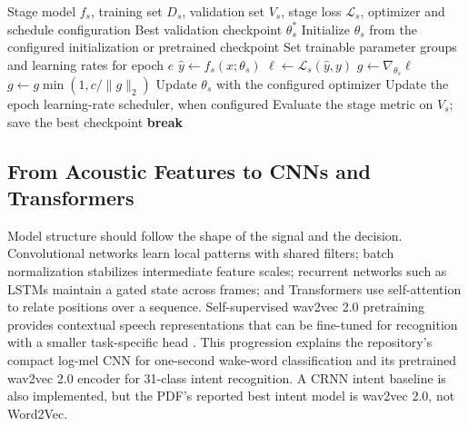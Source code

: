 \begin{algorithm}[H]
  \caption{Stage-wise training with the loss and parameter schedule for each model}
  \label{alg:stagewise-training}
  \begin{algorithmic}[1]
    \Require Stage model $f_s$, training set $D_s$, validation set $V_s$, stage loss $\mathcal{L}_s$, optimizer and schedule configuration
    \Ensure Best validation checkpoint $\theta_s^*$
    \State Initialize $\theta_s$ from the configured initialization or pretrained checkpoint
      \State Set trainable parameter groups and learning rates for epoch $e$
        \State $\hat y\gets f_s(x;\theta_s)$
        \State $\ell\gets\mathcal{L}_s(\hat y,y)$
        \State $g\gets\nabla_{\theta_s}\ell$
        \State $g\gets g\min(1,c/\lVert g\rVert_2)$ 
        \State Update $\theta_s$ with the configured optimizer
      \EndFor
      \State Update the epoch learning-rate scheduler, when configured
      \State Evaluate the stage metric on $V_s$; save the best checkpoint
        \State \textbf{break}
      \EndIf
    \EndFor
  \end{algorithmic}
\end{algorithm}

\subsection{From Acoustic Features to CNNs and Transformers}
\label{subsec:architectures}

Model structure should follow the shape of the signal and the decision. Convolutional networks learn local patterns with shared filters; batch normalization stabilizes intermediate feature scales; recurrent networks such as LSTMs maintain a gated state across frames; and Transformers use self-attention to relate positions over a sequence. Self-supervised wav2vec 2.0 pretraining provides contextual speech representations that can be fine-tuned for recognition with a smaller task-specific head \cite{lecun1998,batchnorm2015,lstm1997,transformer2017,wav2vec2,dscnnkws}. This progression explains the repository's compact log-mel CNN for one-second wake-word classification and its pretrained wav2vec 2.0 encoder for 31-class intent recognition. A CRNN intent baseline is also implemented, but the PDF's reported best intent model is wav2vec 2.0, not Word2Vec.

